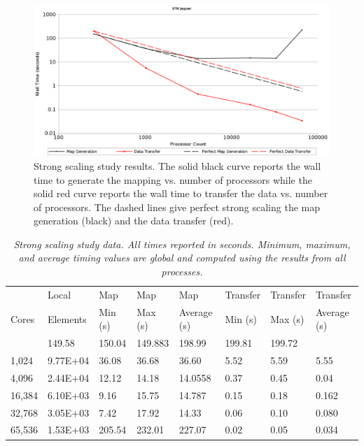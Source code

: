 \documentclass{mc2013}
\begin{document}
\begin{figure}[htpb!]
  \centering \includegraphics[width=5.5in]{StrongScaling.png}
  \caption{Strong scaling study results. The solid black curve reports
    the wall time to generate the mapping vs. number of processors
    while the solid red curve reports the wall time to transfer the
    data vs. number of processors. The dashed lines give perfect
    strong scaling the map generation (black) and the data transfer
    (red).}
  \label{fig:strong_scaling}
\end{figure}

\begin{table}[htpb!]
  \begin{center}
    \begin{tabular}{llllllll}\hline\hline
      \multicolumn{1}{l}{}& \multicolumn{1}{l}{Local} &
      \multicolumn{1}{l}{Map} & \multicolumn{1}{l}{Map} &
      \multicolumn{1}{l}{Map} & \multicolumn{1}{l}{Transfer} &
      \multicolumn{1}{l}{Transfer} &
      \multicolumn{1}{l}{Transfer}\\ \multicolumn{1}{l}{Cores} &
      \multicolumn{1}{l}{Elements} & \multicolumn{1}{l}{Min (s)} &
      \multicolumn{1}{l}{Max (s)} & \multicolumn{1}{l}{Average (s)} &
      \multicolumn{1}{l}{Min (s)} & \multicolumn{1}{l}{Max (s)} &
      \multicolumn{1}{l}{Average (s)}\\ \hline\hline %
      & 149.58& 150.04 & 149.883 & 198.99 & 199.81 & 199.72 \\ 1,024 &
      9.77E+04 & 36.08 & 36.68 & 36.60 & 5.52 & 5.59 & 5.55 \\ 4,096 &
      2.44E+04 & 12.12 & 14.18 & 14.0558 & 0.37 & 0.45 & 0.04
      \\ 16,384 & 6.10E+03 & 9.16 & 15.75 & 14.787 & 0.15 & 0.18 &
      0.162 \\ 32,768 & 3.05E+03 & 7.42 & 17.92 & 14.33 & 0.06 & 0.10
      & 0.080 \\ 65,536 & 1.53E+03 & 205.54 & 232.01 & 227.07 & 0.02 &
      0.05 & 0.034 \\ \hline\hline
    \end{tabular}
  \end{center}
  \caption{\sl Strong scaling study data. All times reported in
    seconds. Minimum, maximum, and average timing values are global
    and computed using the results from all processes.}
  \label{tab:strong_scaling}
\end{table}
\end{document}
